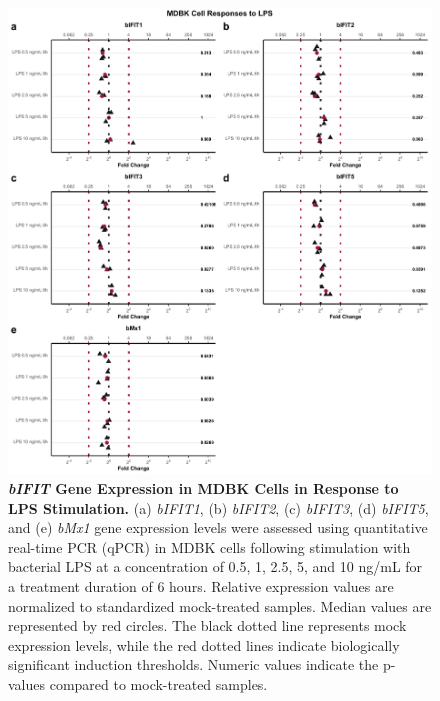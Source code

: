 \begin{figure}
    \centering
    \includegraphics[width=1\linewidth]{07. Chapter 2/Figs/02. Induction/02. mdbk_treat_lps.pdf}
    \caption[\textit{bIFIT} Gene Expression in MDBK Cells in Response to LPS Stimulation.]{\textbf{\textit{bIFIT} Gene Expression in MDBK Cells in Response to LPS Stimulation.} (a) \textit{bIFIT1}, (b) \textit{bIFIT2}, (c) \textit{bIFIT3}, (d) \textit{bIFIT5}, and (e) \textit{bMx1} gene expression levels were assessed using quantitative real-time PCR (qPCR) in MDBK cells following stimulation with bacterial LPS at a concentration of 0.5, 1, 2.5, 5, and 10 ng/mL for a treatment duration of 6 hours. Relative expression values are normalized to standardized mock-treated samples. Median values are represented by red circles. The black dotted line represents mock expression levels, while the red dotted lines indicate biologically significant induction thresholds. Numeric values indicate the p-values compared to mock-treated samples.}
    \label{fig:MDBK responses to LPS}
\end{figure}

